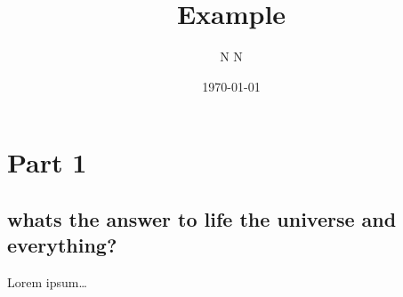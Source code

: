 \documentclass[
]{article}
\title{Example}
\author{N N}
\date{\today}
\begin{document}
\maketitle

\hypertarget{part-1}{%
\section{Part 1}\label{part-1}}

\hypertarget{whats-the-answer-to-life-the-universe-and-everything}{%
\subsection{whats the answer to life the universe and
everything?}\label{whats-the-answer-to-life-the-universe-and-everything}}

Lorem ipsum\ldots{}
\end{document}
